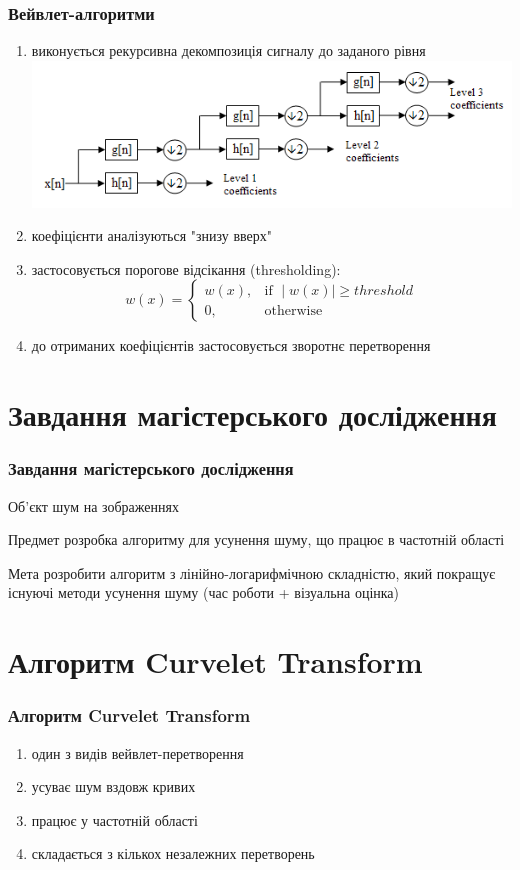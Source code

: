 \documentclass[12pt]{beamer}
\begin{document}
\begin{frame}\frametitle{Вейвлет-алгоритми}
	\begin{enumerate}
		\item виконується рекурсивна декомпозиція сигналу до заданого рівня\linebreak
		\includegraphics[scale=0.3]{images/filter_bank} \linebreak
		\item коефіцієнти аналізуються "знизу вверх" 
		\item застосовується порогове відсікання (thresholding): \linebreak
		\[
		w(x)= 
		\begin{cases}
		w(x),& \text{if } \mid{w(x)}\mid \geq threshold\\
		0,              & \text{otherwise}
		\end{cases}
		\]
		\item до отриманих коефіцієнтів застосовується зворотнє перетворення
	\end{enumerate}
\end{frame}

\section{Завдання магістерського дослідження}
\begin{frame}\frametitle{Завдання магістерського дослідження}
	\begin{block}{Об'єкт}
		шум на зображеннях
	\end{block}
	\begin{block}{Предмет}
		розробка алгоритму для усунення шуму, що працює в частотній області
	\end{block}
	\begin{block}{Мета}
		розробити алгоритм з лінійно-логарифмічною складністю, який покращує існуючі методи усунення шуму (час роботи + візуальна оцінка)
	\end{block}
\end{frame}


\section{Алгоритм Curvelet Transform}
\begin{frame}\frametitle{Алгоритм Curvelet Transform }
	\begin{enumerate}
		\item один з видів вейвлет-перетворення
		\item усуває шум вздовж кривих
		\item працює у частотній області
		\item складається з кількох незалежних перетворень
	\end{enumerate} 
\end{frame}
\end{document}
